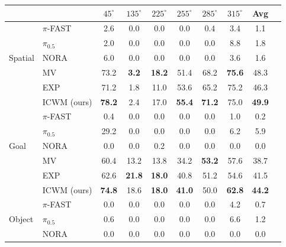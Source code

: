 \documentclass{llmxive}
\providecommand{\rowhighlight}{\rowcolor{deltaBg}}
\begin{document}
\begin{table}[t]\centering
\begin{tabular}{llcccccccc}\toprule
& &$45^\circ$ &$135^\circ$ &$225^\circ$ &$255^\circ$ &$285^\circ$ &$315^\circ$ &Avg \\
\midrule
\multirow{5}{*}{Spatial} &$\pi$-FAST &2.6 &0.0 &0.0 &0.0 &0.4 &3.4 &1.1 \\
&$\pi_{0.5}$ &2.0 &0.0 &0.0 &0.0 &0.0 &8.8 &1.8 \\
&NORA &6.0 &0.0 &0.0 &0.0 &0.0 &3.6 &1.6 \\
&MV &73.2 &\textbf{3.2} &\textbf{18.2} &51.4 &68.2 &\textbf{75.6} &48.3 \\
&EXP &71.2 &1.8 &11.0 &53.6 &65.2 &75.2 &46.3 \\
\rowhighlight
&ICWM (ours) &\textbf{78.2} &2.4 &17.0 &\textbf{55.4} &\textbf{71.2} &75.0 &\textbf{49.9} \\
\midrule
\multirow{5}{*}{Goal} &$\pi$-FAST &0.4 &0.0 &0.0 &0.0 &0.0 &1.0 &0.2 \\
&$\pi_{0.5}$ &29.2 &0.0 &0.0 &0.0 &0.0 &6.2 &5.9 \\
&NORA &0.0 &0.0 &0.2 &0.0 &0.0 &0.0 &0.0 \\
&MV &60.4 &13.2 &13.8 &34.2 &\textbf{53.2} &57.6 &38.7 \\
&EXP &62.6 &\textbf{21.8} &\textbf{18.0} &40.8 &51.2 &54.6 &41.5 \\
\rowhighlight
&ICWM (ours) &\textbf{74.8} &18.6 &\textbf{18.0} &\textbf{41.0} &50.0 &\textbf{62.8} &\textbf{44.2} \\
\midrule
\multirow{5}{*}{Object} &$\pi$-FAST &0.0 &0.0 &0.0 &0.0 &0.0 &4.2 &0.7 \\
&$\pi_{0.5}$ &0.6 &0.0 &0.0 &0.0 &0.0 &6.6 &1.2 \\
&NORA &0.0 &0.0 &0.0 &0.0 &0.0 &0.0 &0.0 \\

\end{tabular}
\end{table}
\end{document}
